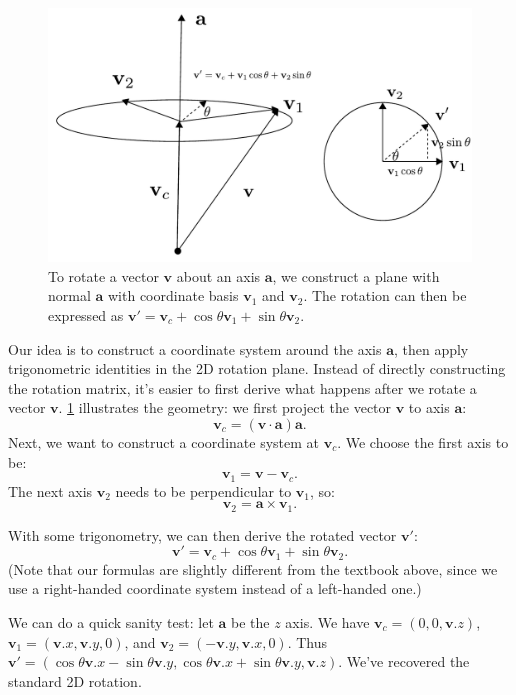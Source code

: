 \begin{figure}[h]
    \centering
    \includegraphics[width=0.5\linewidth]{imgs/rotate_axis.pdf}
    \caption{To rotate a vector $\mathbf{v}$ about an axis $\mathbf{a}$, we construct a plane with normal $\mathbf{a}$ with coordinate basis $\mathbf{v}_1$ and $\mathbf{v}_2$. The rotation can then be expressed as $\mathbf{v}' = \mathbf{v}_c + \cos\theta \mathbf{v}_1 + \sin\theta \mathbf{v}_2$.}
    \label{fig:rotate_axis}
\end{figure}

Our idea is to construct a coordinate system around the axis $\mathbf{a}$, then apply trigonometric identities in the 2D rotation plane. Instead of directly constructing the rotation matrix, it's easier to first derive what happens after we rotate a vector $\mathbf{v}$. \cref{fig:rotate_axis} illustrates the geometry: we first project the vector $\mathbf{v}$ to axis $\mathbf{a}$:
\begin{equation}
\mathbf{v}_c = \left(\mathbf{v} \cdot \mathbf{a}\right)\mathbf{a}.
\end{equation}
Next, we want to construct a coordinate system at $\mathbf{v}_c$. We choose the first axis to be:
\begin{equation}
\mathbf{v}_1 = \mathbf{v} - \mathbf{v}_c.
\end{equation}
The next axis $\mathbf{v}_2$ needs to be perpendicular to $\mathbf{v}_1$, so:
\begin{equation}
\mathbf{v}_2 = \mathbf{a} \times \mathbf{v}_1.
\end{equation}

With some trigonometry, we can then derive the rotated vector $\mathbf{v}'$:
\begin{equation}
\mathbf{v}' = \mathbf{v}_c + \cos\theta \mathbf{v}_1 + \sin\theta \mathbf{v}_2.
\end{equation}
(Note that our formulas are slightly different from the textbook above, since we use a right-handed coordinate system instead of a left-handed one.)

We can do a quick sanity test: let $\mathbf{a}$ be the $z$ axis. We have $\mathbf{v}_c = \left(0, 0, \mathbf{v}.z\right)$, $\mathbf{v}_1 = \left(\mathbf{v}.x, \mathbf{v}.y, 0\right)$, and $\mathbf{v}_2 = \left(-\mathbf{v}.y, \mathbf{v}.x, 0\right)$. Thus $\mathbf{v}' = \left(\cos\theta \mathbf{v}.x - \sin\theta \mathbf{v}.y, \cos\theta \mathbf{v}.x + \sin\theta \mathbf{v}.y, \mathbf{v}.z\right)$. We've recovered the standard 2D rotation.

